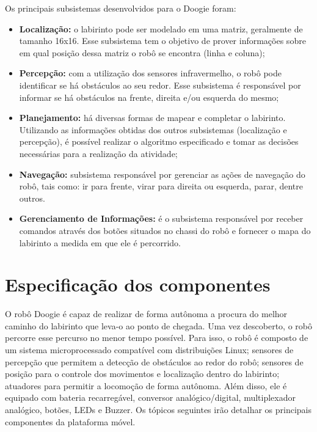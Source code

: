 Os principais subsistemas desenvolvidos para o Doogie foram:
\begin{itemize}
	\item \textbf{Localização:} o labirinto pode ser modelado em uma matriz, geralmente de tamanho 16x16. Esse subsistema tem o objetivo de prover informações sobre em qual posição dessa matriz o robô se encontra (linha e coluna);
	
	\item \textbf{Percepção:} com a utilização dos sensores infravermelho, o robô pode identificar se há obstáculos ao seu redor. Esse subsistema é responsável por informar se há obstáculos na frente, direita e/ou esquerda do mesmo;
	
	\item \textbf{Planejamento:} há diversas formas de mapear e completar o labirinto. Utilizando as informações obtidas dos outros subsistemas (localização e percepção), é possível realizar o algoritmo especificado e tomar as decisões necessárias para a realização da atividade;
	
	\item \textbf{Navegação:} subsistema responsável por gerenciar as ações de navegação do robô, tais como: ir para frente, virar para direita ou esquerda, parar, dentre outros.
	
	\item \textbf{Gerenciamento de Informações:} é o subsistema responsável por receber comandos através dos botões situados no chassi do robô e fornecer o mapa do labirinto a medida em que ele é percorrido. 
\end{itemize}

\section{Especificação dos componentes}
\label{sec:especificacao_dos_componentes}
O robô Doogie é capaz de realizar de forma autônoma a procura do melhor caminho do labirinto que leva-o ao ponto de chegada. Uma vez descoberto, o robô percorre esse percurso no menor tempo possível. Para isso, o robô é composto de um sistema microprocessado compatível com distribuições Linux; sensores de percepção que permitem a detecção de obstáculos ao redor do robô; sensores de posição para o controle dos movimentos e localização dentro do labirinto; atuadores para permitir a locomoção de forma autônoma. Além disso, ele é equipado com bateria recarregável, conversor analógico/digital, multiplexador analógico, botões, LEDs e Buzzer. Os tópicos seguintes irão detalhar os principais componentes da plataforma móvel.


